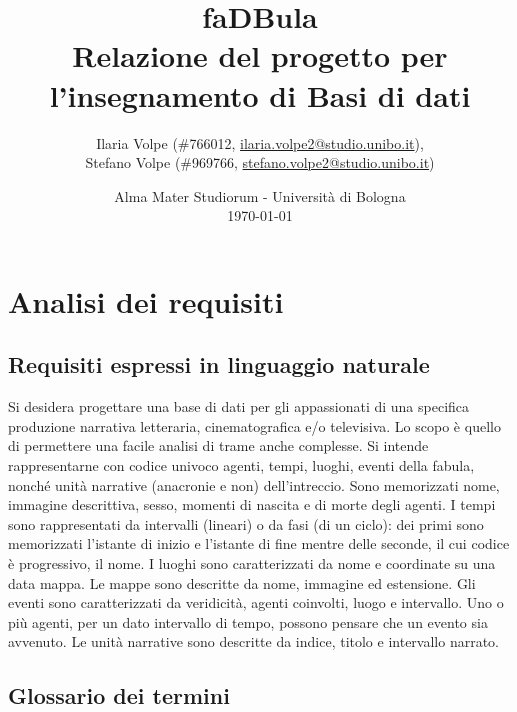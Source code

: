 \documentclass{article}
\title{
	faDBula \\
	\textbf{\large
		Relazione del progetto per l'insegnamento di \break
		Basi di dati
	}
}
\author{
	Ilaria Volpe (\#766012,
	\href{mailto:ilaria.volpe2@studio.unibo.it}{ilaria.volpe2@studio.unibo.it}),
	\\
	Stefano Volpe (\#969766,
	\href{mailto:stefano.volpe2@studio.unibo.it}{stefano.volpe2@studio.unibo.it})
}
\date{
	Alma Mater Studiorum - Universit\`a di Bologna \\
	\today
}
\begin{document}
\maketitle
\thispagestyle{empty}
\pagebreak
\tableofcontents
\pagebreak
\section{Analisi dei requisiti}

\subsection{Requisiti espressi in linguaggio naturale}

Si desidera progettare una base di dati per gli appassionati di una specifica
produzione narrativa letteraria, cinematografica e/o televisiva. Lo scopo è
quello di permettere una facile analisi di trame anche complesse. Si intende
rappresentarne con codice univoco agenti, tempi, luoghi, eventi della fabula,
nonché unità narrative (anacronie e non) dell'intreccio. Sono memorizzati nome,
immagine descrittiva, sesso, momenti di nascita e di morte degli agenti. I
tempi sono rappresentati da intervalli (lineari) o da fasi (di un ciclo): dei
primi sono memorizzati l'istante di inizio e l'istante di fine mentre delle
seconde, il cui codice è progressivo, il nome. I luoghi sono caratterizzati da
nome e coordinate su una data mappa. Le mappe sono descritte da nome, immagine
ed estensione. Gli eventi sono caratterizzati da veridicità, agenti coinvolti,
luogo e intervallo. Uno o più agenti, per un dato intervallo di tempo, possono
pensare che un evento sia avvenuto. Le unità narrative sono descritte da indice,
titolo e intervallo narrato.

\subsection{Glossario dei termini}
\end{document}
